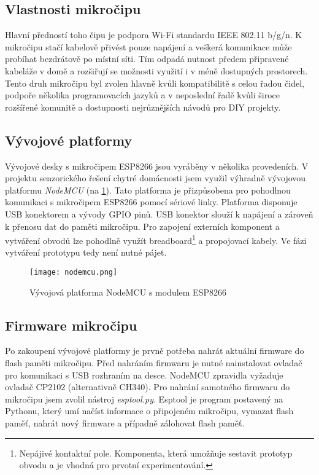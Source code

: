 \subsection*{Vlastnosti mikročipu}
Hlavní předností toho čipu je podpora Wi-Fi standardu IEEE 802.11 b/g/n. K mikročipu stačí kabelově přivést pouze napájení a veškerá komunikace může probíhat bezdrátově po místní síti. Tím odpadá nutnost předem připravené kabeláže v domě a rozšiřují se možnosti využití i v méně dostupných prostorech. Tento druh mikročipu byl zvolen hlavně kvůli kompatibilitě s celou řadou čidel, podpoře několika programovacích jazyků a v neposlední řadě kvůli široce rozšířené komunitě a dostupnosti nejrůznějších návodů pro DIY projekty.

\subsection*{Vývojové platformy}
Vývojové desky s mikročipem ESP8266 jsou vyráběny v několika provedeních. V projektu senzorického řešení chytré domácnosti jsem využil výhradně vývojovou platformu \textit{NodeMCU} (na \cref{fig:nodemcu}). Tato platforma je přizpůsobena pro pohodlnou komunikaci s mikročipem ESP8266 pomocí sériové linky. Platforma disponuje USB konektorem a vývody GPIO pinů. USB konektor slouží k napájení a zároveň k přenosu dat do paměti mikročipu. Pro zapojení externích komponent a vytváření obvodů lze pohodlně využít breadboard\footnote{Nepájivé kontaktní pole. Komponenta, která umožňuje sestavit prototyp obvodu a je vhodná pro prvotní experimentování.} a propojovací kabely. Ve fázi vytváření prototypu tedy není nutné pájet.

\begin{figure}[H]
  \centering
  \texttt{[image: nodemcu.png]}
  \caption{Vývojová platforma NodeMCU s modulem ESP8266}
  \label{fig:nodemcu}
\end{figure}

\subsection*{Firmware mikročipu}
Po zakoupení vývojové platformy je prvně potřeba nahrát aktuální firmware do flash paměti mikročipu. Před nahráním firmwaru je nutné nainstalovat ovladač pro komunikaci s USB rozhraním na desce. NodeMCU zpravidla vyžaduje ovladač CP2102 (alternativně CH340). Pro nahrání samotného firmwaru do mikročipu jsem zvolil nástroj \textit{esptool.py}. Esptool je program postavený na Pythonu, který umí načíst informace o připojeném mikročipu, vymazat flash paměť, nahrát nový firmware a případně zálohovat flash paměť.

